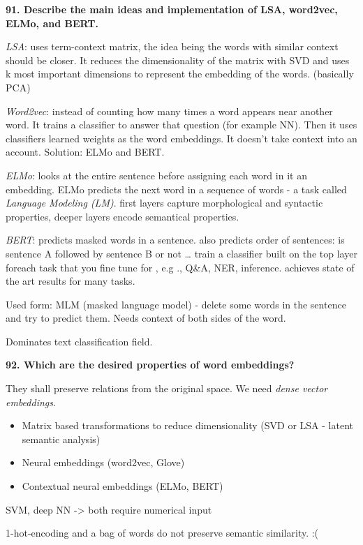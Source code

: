 \textbf{91. Describe the main ideas and implementation of LSA, word2vec,
ELMo, and BERT.}

\textit{LSA}: uses term-context matrix, the idea being the words with
similar context should be closer. It reduces the dimensionality of the
matrix with SVD and uses k most important dimensions to represent the
embedding of the words. (basically PCA)

\textit{Word2vec}: instead of counting how many times a word appears
near another word. It trains a classifier to answer that question (for
example NN). Then it uses classifiers learned weights as the word
embeddings. It doesn't take context into an account. Solution: ELMo and
BERT.

\textit{ELMo}: looks at the entire sentence before assigning each
word in it an embedding. ELMo predicts the next word in a sequence of
words - a task called \textit{Language Modeling (LM)}. first layers
capture morphological and syntactic properties, deeper layers encode
semantical properties.

\textit{BERT}: predicts masked words in a sentence. also predicts
order of sentences: is sentence A followed by sentence B or not \ldots{}
train a classifier built on the top layer foreach task that you fine
tune for , e.g ., Q\&A, NER, inference. achieves state of the art
results for many tasks.

Used form: MLM (masked language model) - delete some words in the
sentence and try to predict them. Needs context of both sides of the
word.

Dominates text classification field.

\textbf{92. Which are the desired properties of word embeddings?}

They shall preserve relations from the original space. We need
\textit{dense vector embeddings}.

\begin{itemize}
\item Matrix based transformations to reduce dimensionality (SVD or LSA -
  latent semantic analysis)
\item Neural embeddings (word2vec, Glove)
\item Contextual neural embeddings (ELMo, BERT)
\end{itemize}

SVM, deep NN -\textgreater{} both require numerical input

1-hot-encoding and a bag of words do not preserve semantic similarity.
:(

